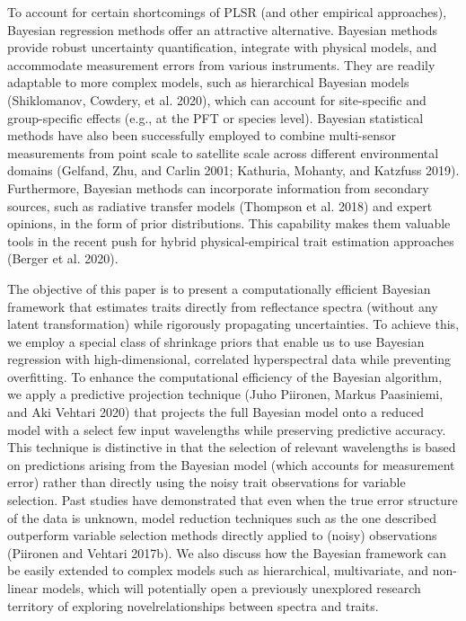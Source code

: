 \documentclass[
  letterpaper,
  DIV=11,
  numbers=noendperiod]{scrartcl}
\begin{document}
To account for certain shortcomings of PLSR (and other empirical
approaches), Bayesian regression methods offer an attractive
alternative. Bayesian methods provide robust uncertainty quantification,
integrate with physical models, and accommodate measurement errors from
various instruments. They are readily adaptable to more complex models,
such as hierarchical Bayesian models (Shiklomanov, Cowdery, et al.
2020), which can account for site-specific and group-specific effects
(e.g., at the PFT or species level). Bayesian statistical methods have
also been successfully employed to combine multi-sensor measurements
from point scale to satellite scale across different environmental
domains (Gelfand, Zhu, and Carlin 2001; Kathuria, Mohanty, and Katzfuss
2019). Furthermore, Bayesian methods can incorporate information from
secondary sources, such as radiative transfer models (Thompson et al.
2018) and expert opinions, in the form of prior distributions. This
capability makes them valuable tools in the recent push for hybrid
physical-empirical trait estimation approaches (Berger et al. 2020).

The objective of this paper is to present a computationally efficient
Bayesian framework that estimates traits directly from reflectance
spectra (without any latent transformation) while rigorously propagating
uncertainties. To achieve this, we employ a special class of shrinkage
priors that enable us to use Bayesian regression with high-dimensional,
correlated hyperspectral data while preventing overfitting. To enhance
the computational efficiency of the Bayesian algorithm, we apply a
predictive projection technique (Juho Piironen, Markus Paasiniemi, and
Aki Vehtari 2020) that projects the full Bayesian model onto a reduced
model with a select few input wavelengths while preserving predictive
accuracy. This technique is distinctive in that the selection of
relevant wavelengths is based on predictions arising from the Bayesian
model (which accounts for measurement error) rather than directly using
the noisy trait observations for variable selection. Past studies have
demonstrated that even when the true error structure of the data is
unknown, model reduction techniques such as the one described outperform
variable selection methods directly applied to (noisy) observations
(Piironen and Vehtari 2017b). We also discuss how the Bayesian framework
can be easily extended to complex models such as hierarchical,
multivariate, and non-linear models, which will potentially open a
previously unexplored research territory of exploring novelrelationships
between spectra and traits.
\end{document}
